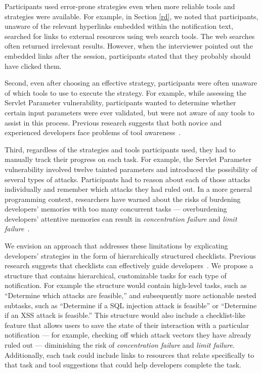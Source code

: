 \documentclass{acm_proc_article-sp}
\begin{document}
Participants used error-prone strategies even when more reliable tools and strategies were available. 
For example, in Section \ref{rd}, we noted that participants, unaware of the relevant hyperlinks embedded within the notification text, searched for links to external resources using web search tools. 
The web searches often returned irrelevant results. 
However, when the interviewer pointed out the embedded links after the session, participants stated that they probably should have clicked them. 

Second, even after choosing an effective strategy, participants were often unaware of which tools to use to execute the strategy.
For example, while assessing the Servlet Parameter vulnerability, participants wanted to determine whether certain input parameters were ever validated, but were not aware of any tools to assist in this process.
Previous research suggests that both novice and experienced developers face problems of tool awareness~\cite{murphy-Hill2012fluency}.

Third, regardless of the strategies and tools participants used, they had to manually track their progress on each task.
For example, the Servlet Parameter vulnerability involved twelve tainted parameters and introduced the possibility of several types of attacks. 
Participants had to reason about each of those attacks individually and remember which attacks they had ruled out.
In a more general programming context, researchers have warned about the risks of burdening developers' memories with too many concurrent tasks 
--- overburdening developers' attentive memories can result in \emph{concentration failure} and \emph{limit failure}~\cite{parnin2012programmer}.

We envision an approach that addresses these limitations by explicating developers' strategies in the form of hierarchically structured checklists.
Previous research suggests that checklists can effectively guide developers~\cite{phang2009triaging}.
We propose a structure that contains hierarchical, customizable tasks for each type of notification.
For example the structure would contain high-level tasks, such as ``Determine which attacks are feasible,'' and subsequently more actionable nested subtasks, such as ``Determine if a SQL injection attack is feasible'' or ``Determine if an XSS attack is feasible.''
This structure would also include a checklist-like feature that allows users to save the state of their interaction with a particular notification --- for example, checking off which attack vectors they have already ruled out --- diminishing the risk of \emph{concentration failure} and \emph{limit failure}.
Additionally, each task could include links to resources that relate specifically to that task and tool suggestions that could help developers complete the task.
\end{document}

